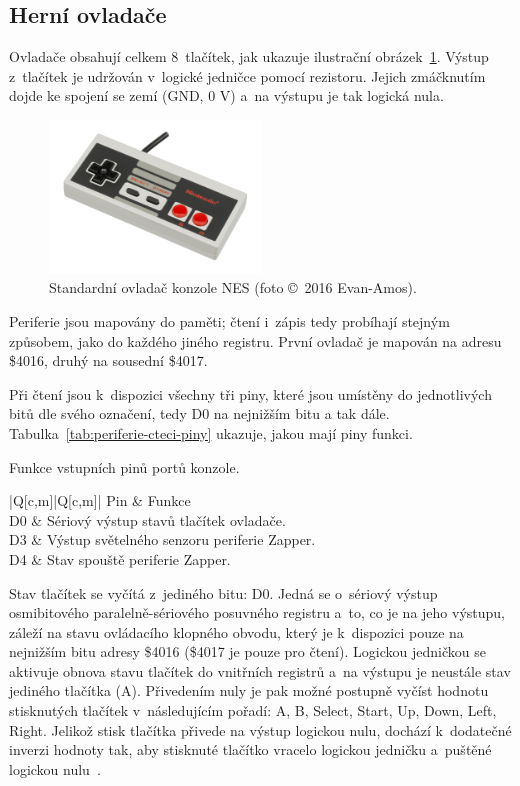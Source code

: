 \subsection{Herní ovladače}
Ovladače obsahují celkem 8~tlačítek, jak ukazuje ilustrační obrázek~\ref{fig:periferie-ovladac}. Výstup z~tlačítek je udržován v~logické jedničce pomocí rezistoru. Jejich zmáčknutím dojde ke spojení se zemí (GND, 0 V) a~na výstupu je tak logická nula.

\begin{figure}[ht!]
	\centering
	\includegraphics[width=0.5\textwidth]{images/nes-ovladac.jpg}
	\caption{Standardní ovladač konzole NES (foto \copyright~2016 Evan-Amos).}
	\label{fig:periferie-ovladac}
\end{figure}

Periferie jsou mapovány do paměti; čtení i~zápis tedy probíhají stejným způsobem, jako do každého jiného registru. První ovladač je mapován na adresu \$4016, druhý na sousední \$4017.

Při čtení jsou k~dispozici všechny tři piny, které jsou umístěny do jednotlivých bitů dle svého označení, tedy D0 na nejnižším bitu a tak dále. Tabulka~\ref{tab:periferie-cteci-piny} ukazuje, jakou mají piny funkci.

\begin{table}[ht!]
	\centering
	\caption{Funkce vstupních pinů portů konzole.}\label{tab:periferie-cteci-piny}
	\begin{tblr}{|Q[c,m]|Q[c,m]|}
		\hline
		Pin & Funkce \\
		\hline[2pt]
		D0 & Sériový výstup stavů tlačítek ovladače. \\
		\hline
		D3 & Výstup světelného senzoru periferie Zapper. \\
		\hline
		D4 & Stav spouště periferie Zapper. \\ 
		\hline
	\end{tblr}
\end{table}

Stav tlačítek se vyčítá z~jediného bitu: D0. Jedná se o~sériový výstup osmibitového paralelně-sériového posuvného registru a~to, co je na jeho výstupu, záleží na stavu ovládacího klopného obvodu, který je k~dispozici pouze na nejnižším bitu adresy \$4016 (\$4017 je pouze pro čtení). Logickou jedničkou se aktivuje obnova stavu tlačítek do vnitřních registrů a~na výstupu je neustále stav jediného tlačítka (A). Přivedením nuly je pak možné postupně vyčíst hodnotu stisknutých tlačítek v~následujícím pořadí: A, B, Select, Start, Up, Down, Left, Right. Jelikož stisk tlačítka přivede na výstup logickou nulu, dochází k~dodatečné inverzi hodnoty tak, aby stisknuté tlačítko vracelo logickou jedničku a~puštěné logickou nulu~\cite{Nesdev:standard-controller}.

